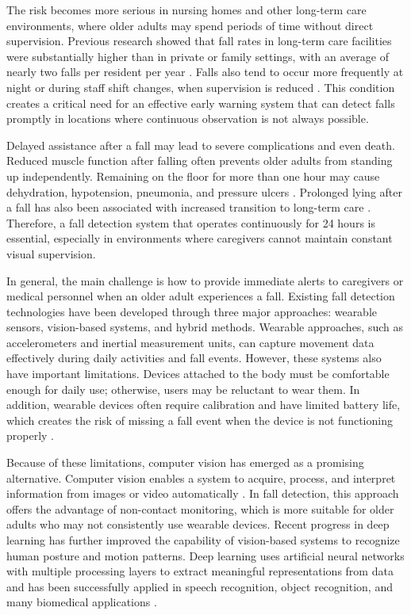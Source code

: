\documentclass[10pt,TimesNewRoman,a4paper]{matrikenglish}
\begin{document}
The risk becomes more serious in nursing homes and other long-term care environments, where older adults may spend periods of time without direct supervision. Previous research showed that fall rates in long-term care facilities were substantially higher than in private or family settings, with an average of nearly two falls per resident per year \cite{Albasha2024}. Falls also tend to occur more frequently at night or during staff shift changes, when supervision is reduced \cite{Albasha2024}. This condition creates a critical need for an effective early warning system that can detect falls promptly in locations where continuous observation is not always possible.

Delayed assistance after a fall may lead to severe complications and even death. Reduced muscle function after falling often prevents older adults from standing up independently. Remaining on the floor for more than one hour may cause dehydration, hypotension, pneumonia, and pressure ulcers \cite{Fleming2008}. Prolonged lying after a fall has also been associated with increased transition to long-term care \cite{Fleming2008}. Therefore, a fall detection system that operates continuously for 24 hours is essential, especially in environments where caregivers cannot maintain constant visual supervision.

In general, the main challenge is how to provide immediate alerts to caregivers or medical personnel when an older adult experiences a fall. Existing fall detection technologies have been developed through three major approaches: wearable sensors, vision-based systems, and hybrid methods. Wearable approaches, such as accelerometers and inertial measurement units, can capture movement data effectively during daily activities and fall events. However, these systems also have important limitations. Devices attached to the body must be comfortable enough for daily use; otherwise, users may be reluctant to wear them. In addition, wearable devices often require calibration and have limited battery life, which creates the risk of missing a fall event when the device is not functioning properly \cite{Mubashir2013}.

Because of these limitations, computer vision has emerged as a promising alternative. Computer vision enables a system to acquire, process, and interpret information from images or video automatically \cite{Negoro2023}. In fall detection, this approach offers the advantage of non-contact monitoring, which is more suitable for older adults who may not consistently use wearable devices. Recent progress in deep learning has further improved the capability of vision-based systems to recognize human posture and motion patterns. Deep learning uses artificial neural networks with multiple processing layers to extract meaningful representations from data and has been successfully applied in speech recognition, object recognition, and many biomedical applications \cite{LeCun2015}.
\end{document}
